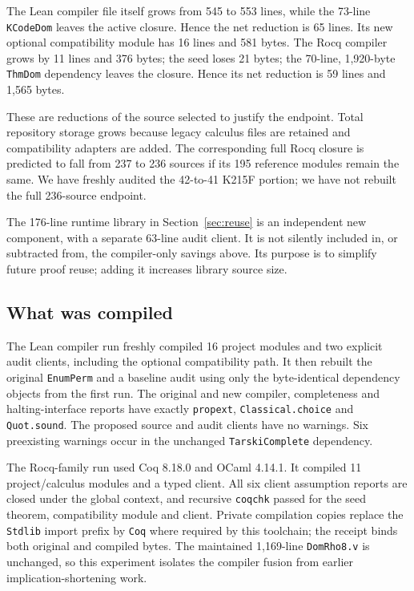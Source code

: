 \documentclass[11pt]{article}
\theoremstyle{definition}\newtheorem{definition}[theorem]{Definition}
\newcommand{\code}[1]{\texttt{#1}}
\begin{document}
The Lean compiler file itself grows from 545 to 553 lines, while the 73-line
\code{KCodeDom} leaves the active closure. Hence the net reduction is 65 lines.
Its new optional compatibility module has 16 lines and 581 bytes. The Rocq
compiler grows by 11 lines and 376 bytes; the seed loses 21 bytes; the 70-line,
1,920-byte \code{ThmDom} dependency leaves the closure. Hence its net reduction
is 59 lines and 1,565 bytes.

These are reductions of the source selected to justify the endpoint. Total
repository storage grows because legacy calculus files are retained and
compatibility adapters are added. The corresponding full Rocq closure is
predicted to fall from 237 to 236 sources if its 195 reference modules remain
the same. We have freshly audited the 42-to-41 K215F portion; we have not rebuilt
the full 236-source endpoint.

The 176-line runtime library in Section~\ref{sec:reuse} is an independent new
component, with a separate 63-line audit client. It is not silently included in,
or subtracted from, the compiler-only savings above. Its purpose is to simplify
future proof reuse; adding it increases library source size.

\subsection{What was compiled}

The Lean compiler run freshly compiled 16 project modules and two explicit
audit clients, including the optional compatibility path. It then rebuilt the
original \code{EnumPerm} and a baseline audit using only the byte-identical
dependency objects from the first run. The original and new compiler,
completeness and halting-interface reports have exactly
\code{propext}, \code{Classical.choice} and \code{Quot.sound}. The proposed
source and audit clients have no warnings. Six preexisting warnings occur in
the unchanged \code{TarskiComplete} dependency.

The Rocq-family run used Coq 8.18.0 and OCaml 4.14.1. It compiled 11
project/calculus modules and a typed client. All six client assumption reports
are closed under the global context, and recursive \code{coqchk} passed for
the seed theorem, compatibility module and client. Private compilation copies
replace the \code{Stdlib} import prefix by \code{Coq} where required by this
toolchain; the receipt binds both original and compiled bytes. The maintained
1,169-line \code{DomRho8.v} is unchanged, so this experiment isolates the
compiler fusion from earlier implication-shortening work.
\end{document}
